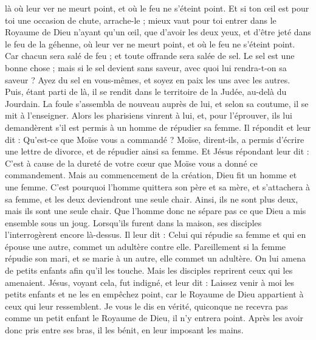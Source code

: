 \begin{multicols}{2}
là où leur ver ne meurt point, et où le feu ne s'éteint point.
Et si ton œil est pour toi une occasion de chute, arrache-le ; mieux vaut pour toi entrer dans le Royaume de Dieu n'ayant qu'un œil, que d'avoir les deux yeux, et d’être jeté dans le feu de la géhenne,
où leur ver ne meurt point, et où le feu ne s'éteint point.
Car chacun sera salé de feu ; et toute offrande sera salée de sel.
Le sel est une bonne chose ; mais si le sel devient sans saveur, avec quoi lui rendra-t-on sa saveur ?
Ayez du sel en vous-mêmes, et soyez en paix les uns avec les autres.
\VerseOne{}Puis, étant parti de là, il se rendit dans le territoire de la Judée, au-delà du Jourdain. La foule s’assembla de nouveau auprès de lui, et selon sa coutume, il se mit à l’enseigner.
Alors les pharisiens vinrent à lui, et, pour l'éprouver, ils lui demandèrent s’il est permis à un homme de répudier sa femme.
Il répondit et leur dit : Qu'est-ce que Moïse vous a commandé ?
Moïse, dirent-ils, a permis d'écrire une lettre de divorce, et de répudier ainsi sa femme.
Et Jésus répondant leur dit : C’est à cause de la dureté de votre cœur que Moïse vous a donné ce commandement.
Mais au commencement de la création, Dieu fit un homme et une femme.
C'est pourquoi l'homme quittera son père et sa mère, et s'attachera à sa femme,
et les deux deviendront une seule chair. Ainsi, ils ne sont plus deux, mais ils sont une seule chair.
Que l'homme donc ne sépare pas ce que Dieu a mis ensemble sous un joug.
Lorsqu’ils furent dans la maison, ses disciples l'interrogèrent encore là-dessus.
Il leur dit : Celui qui répudie sa femme et qui en épouse une autre, commet un adultère contre elle.
Pareillement si la femme répudie son mari, et se marie à un autre, elle commet un adultère.
On lui amena de petits enfants afin qu'il les touche. Mais les disciples reprirent ceux qui les amenaient.
Jésus, voyant cela, fut indigné, et leur dit : Laissez venir à moi les petits enfants et ne les en empêchez point, car le Royaume de Dieu appartient à ceux qui leur ressemblent.
Je vous le dis en vérité, quiconque ne recevra pas comme un petit enfant le Royaume de Dieu, il n'y entrera point.
Après les avoir donc pris entre ses bras, il les bénit, en leur imposant les mains.

\end{multicols}
